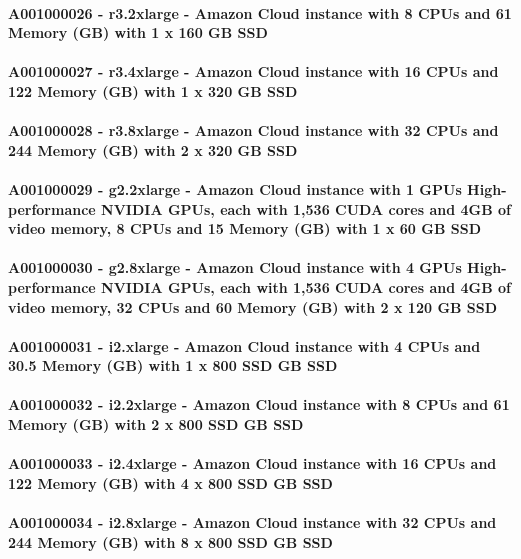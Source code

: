 \documentclass{acm_proc_article-sp}
\begin{document}
\paragraph{A001000026 - r3.2xlarge - Amazon Cloud instance with 8 CPUs and 61 Memory (GB) with 1 x 160 GB SSD}
\paragraph{A001000027 - r3.4xlarge - Amazon Cloud instance with 16 CPUs and 122 Memory (GB) with 1 x 320 GB SSD}
\paragraph{A001000028 - r3.8xlarge - Amazon Cloud instance with 32 CPUs and 244 Memory (GB) with 2 x 320 GB SSD}
\paragraph{A001000029 - g2.2xlarge - Amazon Cloud instance with 1 GPUs High-performance NVIDIA GPUs, each with 1,536 CUDA cores and 4GB of video memory, 8 CPUs and 15 Memory (GB) with 1 x 60 GB SSD}
\paragraph{A001000030 - g2.8xlarge - Amazon Cloud instance with 4 GPUs High-performance NVIDIA GPUs, each with 1,536 CUDA cores and 4GB of video memory, 32 CPUs and 60 Memory (GB) with 2 x 120 GB SSD}
\paragraph{A001000031 - i2.xlarge - Amazon Cloud instance with 4 CPUs and 30.5 Memory (GB) with 1 x 800 SSD GB SSD}
\paragraph{A001000032 - i2.2xlarge - Amazon Cloud instance with 8 CPUs and 61 Memory (GB) with 2 x 800 SSD GB SSD}
\paragraph{A001000033 - i2.4xlarge - Amazon Cloud instance with 16 CPUs and 122 Memory (GB) with 4 x 800 SSD GB SSD}
\paragraph{A001000034 - i2.8xlarge - Amazon Cloud instance with 32 CPUs and 244 Memory (GB) with 8 x 800 SSD GB SSD}
\end{document}
